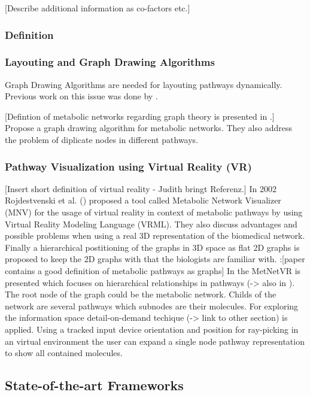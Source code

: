 [Describe additional information as co-factors etc.]

\subsubsection{Definition}

\subsubsection{Layouting and Graph Drawing Algorithms}

Graph Drawing Algorithms are needed for layouting pathways dynamically.
Previous work on this issue was done by \citep{Becker2001}.

[Defintion of metabolic networks regarding graph theory is presented in \citep{Bourqui2006}.]
Propose a graph drawing algorithm for metabolic networks\citep{Bourqui2006}. They also address the problem of diplicate nodes
in different pathways.

\subsubsection{Pathway Visualization using Virtual Reality (VR)}

[Insert short definition of virtual reality - Judith bringt Referenz.]
In 2002 Rojdestvenski et al. (\citep{Rojdestvenski2002, Rojdestvenski2003}) proposed a tool called Metabolic Network Visualizer (MNV) for the usage of virtual reality in context of metabolic pathways by using Virtual Reality Modeling Language (VRML). They also discuss advantages and possible problems when using a real 3D representation of the biomedical network. Finally a hierarchical postitioning of the graphs in 3D space as flat 2D graphs is proposed to keep the 2D graphs with that the biologists are familiar with. 
\citep{Dickerson2003}:[paper contains a good definition of metabolic pathways as graphs]
In \citep{Yang2006} the MetNetVR is presented which focuses on hierarchical relationships in pathways (-> also in \citep{Dogrusoz2004}). The root node of the graph could
be the metabolic network. Childs of the network are several pathways which subnodes are their molecules. For exploring the information space detail-on-demand techique (-> link to other section) is applied. Using a tracked input device orientation and position for  ray-picking in an virtual environment the user can expand a single node pathway representation to show all contained molecules.

\subsection{State-of-the-art Frameworks}

